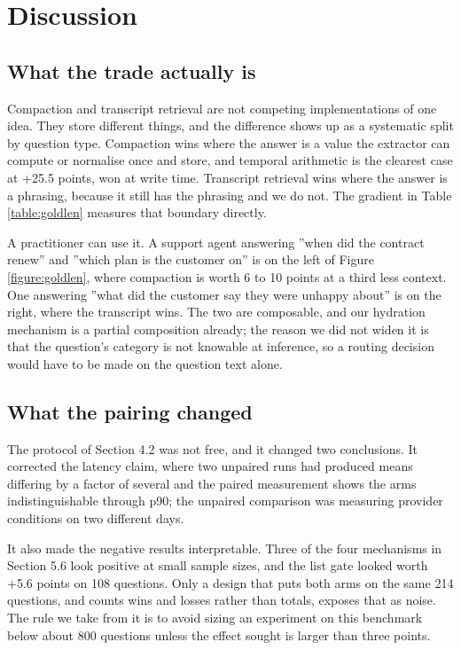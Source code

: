 \documentclass[10pt,a4paper,twocolumn]{article}
\begin{document}
\section{Discussion}

\subsection{What the trade actually is}

Compaction and transcript retrieval are not competing implementations of one idea. They store different things, and the difference shows up as a systematic split by question type. Compaction wins where the answer is a value the extractor can compute or normalise once and store, and temporal arithmetic is the clearest case at +25.5 points, won at write time. Transcript retrieval wins where the answer is a phrasing, because it still has the phrasing and we do not. The gradient in Table \ref{table:goldlen} measures that boundary directly.

A practitioner can use it. A support agent answering ''when did the contract renew'' and ''which plan is the customer on'' is on the left of Figure \ref{figure:goldlen}, where compaction is worth 6 to 10 points at a third less context. One answering ''what did the customer say they were unhappy about'' is on the right, where the transcript wins. The two are composable, and our hydration mechanism is a partial composition already; the reason we did not widen it is that the question's category is not knowable at inference, so a routing decision would have to be made on the question text alone.

\subsection{What the pairing changed}

The protocol of Section 4.2 was not free, and it changed two conclusions. It corrected the latency claim, where two unpaired runs had produced means differing by a factor of several and the paired measurement shows the arms indistinguishable through p90; the unpaired comparison was measuring provider conditions on two different days.

It also made the negative results interpretable. Three of the four mechanisms in Section 5.6 look positive at small sample sizes, and the list gate looked worth +5.6 points on 108 questions. Only a design that puts both arms on the same 214 questions, and counts wins and losses rather than totals, exposes that as noise. The rule we take from it is to avoid sizing an experiment on this benchmark below about 800 questions unless the effect sought is larger than three points.
\end{document}
